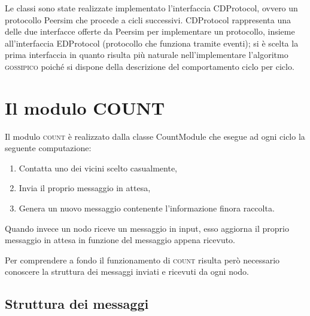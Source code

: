 \documentclass[a4paper,12pt]{article}
\begin{document}
Le classi sono state realizzate implementato l'interfaccia \textsf{CDProtocol}, ovvero un protocollo Peersim che procede a cicli successivi. \textsf{CDProtocol} rappresenta una delle due interfacce offerte da Peersim per implementare un protocollo, insieme all'interfaccia \textsf{EDProtocol} (protocollo che funziona tramite eventi); si \`e scelta la prima interfaccia in quanto risulta pi\`u naturale nell'implementare l'algoritmo \textsc{gossipico} poich\'e si dispone della descrizione del comportamento ciclo per ciclo.

\section{Il modulo COUNT}
\label{sec:count}

Il modulo \textsc{count} \`e realizzato dalla classe \textsf{CountModule} che esegue ad ogni ciclo la seguente computazione:
\begin{enumerate}
\item Contatta uno dei vicini scelto casualmente,
\item Invia il proprio messaggio in attesa,
\item Genera un nuovo messaggio contenente l'informazione finora raccolta.
\end{enumerate}

Quando invece un nodo riceve un messaggio in input, esso aggiorna il proprio messaggio in attesa in funzione del messaggio appena ricevuto.

Per comprendere a fondo il funzionamento di \textsc{count} risulta per\`o necessario conoscere la struttura dei messaggi inviati e ricevuti da ogni nodo.

\subsection{Struttura dei messaggi}
\end{document}
